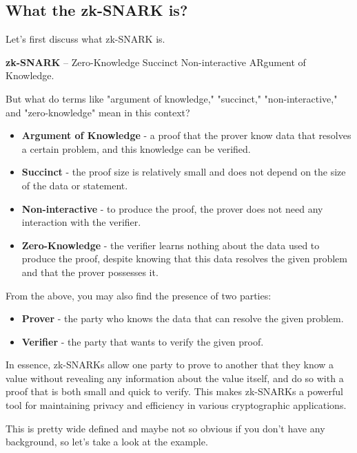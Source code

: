 \documentclass[../lecture-notes.tex]{subfiles}
\begin{document}
\subsection{What the zk-SNARK is?}

Let's first discuss what zk-SNARK is.

\begin{definition}
    \textbf{zk-SNARK} – Zero-Knowledge Succinct Non-interactive ARgument of Knowledge.
\end{definition}

But what do terms like "argument of knowledge," "succinct," "non-interactive," and 
"zero-knowledge" mean in this context?

\begin{itemize}
    \item \textbf{Argument of Knowledge} - a proof that the prover know data that resolves a certain
    problem, and this knowledge can be verified.
    \item \textbf{Succinct} - the proof size is relatively small and does not depend on the size of 
    the data or statement.
    \item \textbf{Non-interactive} - to produce the proof, the prover does not need any interaction
    with the verifier.
    \item \textbf{Zero-Knowledge} - the verifier learns nothing about the data used to produce the
    proof, despite knowing that this data resolves the given problem and that the prover possesses it.
\end{itemize}

From the above, you may also find the presence of two parties:

\begin{itemize}
    \item \textbf{Prover} - the party who knows the data that can resolve the given problem.
    \item \textbf{Verifier} - the party that wants to verify the given proof.
\end{itemize}

In essence, zk-SNARKs allow one party to prove to another that they know a value without revealing 
any information about the value itself, and do so with a proof that is both small and quick to 
verify. This makes zk-SNARKs a powerful tool for maintaining privacy and efficiency in various 
cryptographic applications.

This is pretty wide defined and maybe not so obvious if you don't have any background, so let's take
a look at the example.
\end{document}
